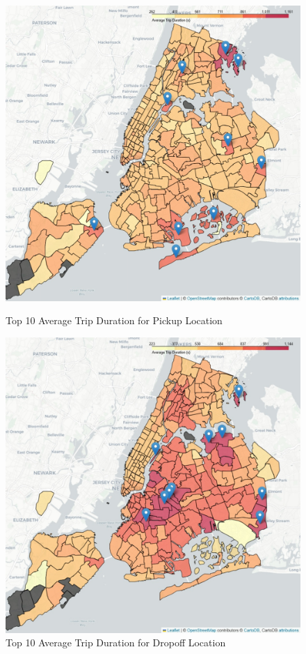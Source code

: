 \documentclass[11pt]{article}
\begin{document}
\begin{figure}[h!]
  \centering
  \begin{minipage}[b]{0.45\textwidth}
    \includegraphics[width=\textwidth]{top10_avg_trip_duration_for_pickup_location.jpg}
    \caption{Top 10 Average Trip Duration for Pickup Location}
    \label{fig:image1}
  \end{minipage}
  \hfill
  \begin{minipage}[b]{0.45\textwidth}
    \includegraphics[width=\textwidth]{top10_avg_trip_duration_for_dropoff_location.jpg}
    \caption{Top 10 Average Trip Duration for Dropoff Location}
    \label{fig:image2}
  \end{minipage}
\end{figure}
\end{document}
